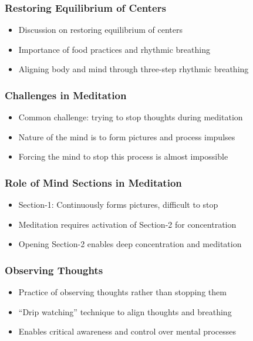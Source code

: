 \begin{frame}[fragile]\frametitle{Restoring Equilibrium of Centers}
    \begin{itemize}
        \item Discussion on restoring equilibrium of centers
        \item Importance of food practices and rhythmic breathing
        \item Aligning body and mind through three-step rhythmic breathing
    \end{itemize}
\end{frame}

\begin{frame}[fragile]\frametitle{Challenges in Meditation}
    \begin{itemize}
        \item Common challenge: trying to stop thoughts during meditation
        \item Nature of the mind is to form pictures and process impulses
        \item Forcing the mind to stop this process is almost impossible
    \end{itemize}
\end{frame}

\begin{frame}[fragile]\frametitle{Role of Mind Sections in Meditation}
    \begin{itemize}
        \item Section-1: Continuously forms pictures, difficult to stop
        \item Meditation requires activation of Section-2 for concentration
        \item Opening Section-2 enables deep concentration and meditation
    \end{itemize}
\end{frame}

\begin{frame}[fragile]\frametitle{Observing Thoughts}
    \begin{itemize}
        \item Practice of observing thoughts rather than stopping them
        \item “Drip watching” technique to align thoughts and breathing
        \item Enables critical awareness and control over mental processes
    \end{itemize}
\end{frame}

